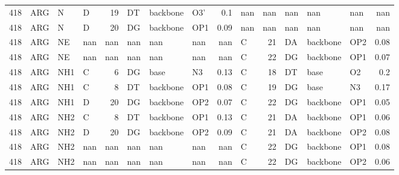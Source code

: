 \begin{longtable}{rlllrlllrlrlllr}
       418 & ARG        & N      & D         &          19 & DT           & backbone    & O3'      &          0.1  & nan       &         nan & nan          & nan         & nan      &        nan    \\
       418 & ARG        & N      & D         &          20 & DG           & backbone    & OP1      &          0.09 & nan       &         nan & nan          & nan         & nan      &        nan    \\
       418 & ARG        & NE     & nan       &         nan & nan          & nan         & nan      &        nan    & C         &          21 & DA           & backbone    & OP2      &          0.08 \\
       418 & ARG        & NE     & nan       &         nan & nan          & nan         & nan      &        nan    & C         &          22 & DG           & backbone    & OP1      &          0.07 \\
       418 & ARG        & NH1    & C         &           6 & DG           & base        & N3       &          0.13 & C         &          18 & DT           & base        & O2       &          0.2  \\
       418 & ARG        & NH1    & C         &           8 & DT           & backbone    & OP1      &          0.08 & C         &          19 & DG           & base        & N3       &          0.17 \\
       418 & ARG        & NH1    & D         &          20 & DG           & backbone    & OP2      &          0.07 & C         &          22 & DG           & backbone    & OP1      &          0.05 \\
       418 & ARG        & NH2    & C         &           8 & DT           & backbone    & OP1      &          0.13 & C         &          21 & DA           & backbone    & OP1      &          0.06 \\
       418 & ARG        & NH2    & D         &          20 & DG           & backbone    & OP2      &          0.09 & C         &          21 & DA           & backbone    & OP2      &          0.08 \\
       418 & ARG        & NH2    & nan       &         nan & nan          & nan         & nan      &        nan    & C         &          22 & DG           & backbone    & OP1      &          0.08 \\
       418 & ARG        & NH2    & nan       &         nan & nan          & nan         & nan      &        nan    & C         &          22 & DG           & backbone    & OP2      &          0.06 \\

\end{longtable}
